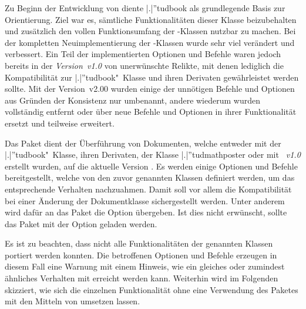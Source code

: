 \bigskip\noindent
\begin{DeclareEntity}{}
\begin{NoIndexDefault}
Zu Beginn der Entwicklung von \TUDScript diente \Class|.|''{tudbook} als 
grundlegende Basis zur Orientierung. Ziel war es, sämtliche Funktionalitäten 
dieser Klasse beizubehalten und zusätzlich den vollen Funktionsumfang der 
\KOMAScript-Klassen nutzbar zu machen. Bei der kompletten Neuimplementierung 
der \TUDScript-Klassen wurde sehr viel verändert und verbessert. Ein Teil der 
implementierten Optionen und Befehle waren jedoch bereits in der 
\emph{Version~v1.0} von \TUDScript unerwünschte Relikte, mit denen lediglich 
die Kompatibilität zur \Class|.|''{tudbook}"~Klasse und ihren Derivaten 
gewährleistet werden sollte. Mit der Version~v2.00 wurden einige der unnötigen 
Befehle und Optionen aus Gründen der Konsistenz nur umbenannt, andere wiederum 
wurden vollständig entfernt oder über neue Befehle und Optionen in ihrer 
Funktionalität ersetzt und teilweise erweitert. 

Das Paket  dient der Überführung von Dokumenten, welche
entweder mit der \Class|.|''{tudbook}"~Klasse, ihren Derivaten, 
der Klasse \Class|.|''{tudmathposter} oder mit \emph{\TUDScript~v1.0} 
erstellt wurden, auf die aktuelle Version \TUDScriptVersion. Es werden einige 
Optionen und Befehle bereitgestellt, welche von den zuvor genannten Klassen 
definiert werden, um das entsprechende Verhalten nachzuahmen. Damit soll vor 
allem die Kompatibilität bei einer Änderung der Dokumentklasse sichergestellt 
werden. Unter anderem wird dafür an das Paket  die Option 
 übergeben. Ist dies nicht erwünscht, sollte das Paket mit der 
Option  geladen werden.
%
\begin{quoting}
\end{quoting}
%
Es ist zu beachten, dass nicht alle Funktionalitäten der genannten Klassen 
portiert werden konnten. Die betroffenen Optionen und Befehle erzeugen in 
diesem Fall eine Warnung mit einem Hinweis, wie ein gleiches oder zumindest 
ähnliches Verhalten mit \TUDScript erreicht werden kann. Weiterhin wird im 
Folgenden skizziert, wie sich die einzelnen Funktionalität ohne eine Verwendung 
des Paketes  mit den Mitteln von \TUDScript umsetzen 
lassen. 


\end{NoIndexDefault}
\end{DeclareEntity}
